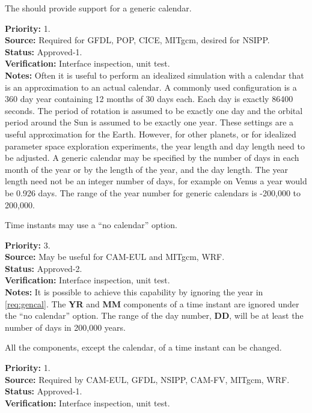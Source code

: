 \label{req:gencal}
The \funcname should provide support for a generic calendar.
\begin{reqlist}
{\bf Priority:} 1. \\
{\bf Source:} Required for GFDL, POP, CICE, MITgcm, desired for NSIPP.  \\
{\bf Status:} Approved-1. \\
{\bf Verification:} Interface inspection, unit test. \\
{\bf Notes:}
Often it is useful to perform an idealized simulation with a calendar
that is an approximation to an actual calendar. A commonly used
configuration is a 360 day year containing 12 months of 30 days each.
Each day is exactly 86400 seconds. The period of rotation is
assumed to be exactly one day and the orbital period around the Sun
is assumed to be exactly one year.
These settings are a useful approximation for the Earth. However, for other
planets, or for idealized parameter space exploration experiments, the year 
length and day length need to be adjusted. A generic calendar may be
specified by the number of days in each month of the year or by 
the length of the year, and the day
length.  The year length need not be an integer
number of days, for example on Venus a year would be 0.926 days.
The range of the year number for generic calendars is -200,000 to
200,000.
\end{reqlist}

Time instants may use a ``no calendar'' option.
\begin{reqlist}
{\bf Priority:} 3. \\
{\bf Source:} May be useful for CAM-EUL and MITgcm, WRF. \\
{\bf Status:} Approved-2. \\
{\bf Verification:} Interface inspection, unit test. \\
{\bf Notes:}  It is possible to achieve this capability by ignoring the year in 
\ref{req:gencal}.  The {\bf YR} and {\bf MM} components of a time instant
are ignored under the ``no calendar'' option.  The range of the day number,
{\bf DD}, will be at least the number of days in 200,000 years.
\end{reqlist}


All the components, except the calendar, of a time instant can be changed.
\begin{reqlist}
{\bf Priority:} 1. \\
{\bf Source:} Required by CAM-EUL, GFDL, NSIPP, CAM-FV, MITgcm, WRF. \\
{\bf Status:} Approved-1. \\
{\bf Verification:} Interface inspection, unit test. 
\end{reqlist}

